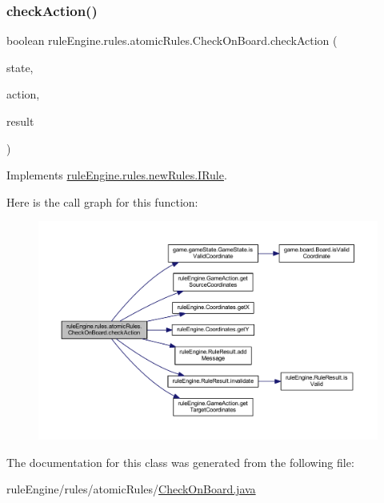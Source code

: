 \subsubsection{\texorpdfstring{check\+Action()}{checkAction()}}
{\footnotesize\ttfamily boolean rule\+Engine.\+rules.\+atomic\+Rules.\+Check\+On\+Board.\+check\+Action (\begin{DoxyParamCaption}\item[{\mbox{\hyperlink{classgame_1_1game_state_1_1_game_state}{Game\+State}}}]{state,  }\item[{\mbox{\hyperlink{classrule_engine_1_1_game_action}{Game\+Action}}}]{action,  }\item[{\mbox{\hyperlink{classrule_engine_1_1_rule_result}{Rule\+Result}}}]{result }\end{DoxyParamCaption})\hspace{0.3cm}{\ttfamily [inline]}}



Implements \mbox{\hyperlink{interfacerule_engine_1_1rules_1_1new_rules_1_1_i_rule_a72ce29a47d7a5fba75a09444a50a481e}{rule\+Engine.\+rules.\+new\+Rules.\+I\+Rule}}.

Here is the call graph for this function\+:
\nopagebreak
\begin{figure}[H]
\begin{center}
\leavevmode
\includegraphics[width=350pt]{classrule_engine_1_1rules_1_1atomic_rules_1_1_check_on_board_a73df87709e976673d0d42d0935a3a536_cgraph}
\end{center}
\end{figure}


The documentation for this class was generated from the following file\+:\begin{DoxyCompactItemize}
\item 
rule\+Engine/rules/atomic\+Rules/\mbox{\hyperlink{_check_on_board_8java}{Check\+On\+Board.\+java}}\end{DoxyCompactItemize}
